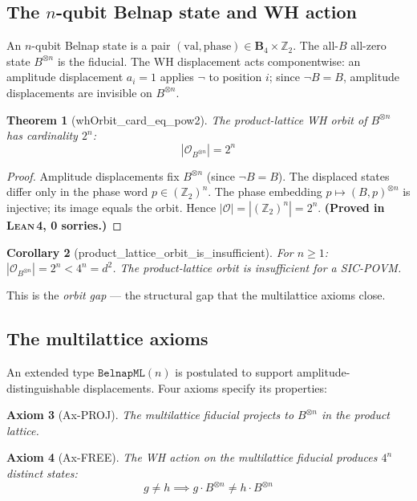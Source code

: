 \documentclass[12pt,a4paper]{article}
\newtheorem{theorem}{Theorem}[section]
\newtheorem{corollary}[theorem]{Corollary}
\newtheorem{axiom_env}[theorem]{Axiom}
\newcommand{\BFour}{\mathbf{B}_4}
\newcommand{\Lean}{\textsc{Lean\,4}}
\begin{document}
\subsection{The $n$-qubit Belnap state and WH action}

An $n$-qubit Belnap state is a pair $(\text{val}, \text{phase}) \in \BFour \times \mathbb{Z}_2$.
The all-$B$ all-zero state $B^{\otimes n}$ is the fiducial.  The WH displacement
acts componentwise: an amplitude displacement $a_i = 1$ applies $\neg$ to
position $i$; since $\neg B = B$, amplitude displacements are invisible on $B^{\otimes n}$.

\begin{theorem}[whOrbit\_card\_eq\_pow2]
\label{thm:orbit-2n}
The product-lattice WH orbit of $B^{\otimes n}$ has cardinality $2^n$:
\[
|\mathcal{O}_{B^{\otimes n}}| = 2^n
\]
\end{theorem}

\begin{proof}
Amplitude displacements fix $B^{\otimes n}$ (since $\neg B = B$).  The displaced
states differ only in the phase word $p \in (\mathbb{Z}_2)^n$.  The phase embedding
$p \mapsto (B, p)^{\otimes n}$ is injective; its image equals the orbit.
Hence $|\mathcal{O}| = |(\mathbb{Z}_2)^n| = 2^n$.  \textbf{(Proved in \Lean{}, 0 sorries.)}
\end{proof}

\begin{corollary}[product\_lattice\_orbit\_is\_insufficient]
\label{cor:gap}
For $n \geq 1$: $|\mathcal{O}_{B^{\otimes n}}| = 2^n < 4^n = d^2$.
The product-lattice orbit is insufficient for a SIC-POVM.
\end{corollary}

This is the \emph{orbit gap} --- the structural gap that the multilattice
axioms close.

\subsection{The multilattice axioms}

An extended type $\texttt{BelnapML}(n)$ is postulated to support amplitude-distinguishable
displacements.  Four axioms specify its properties:

\begin{axiom_env}[Ax-PROJ]
The multilattice fiducial projects to $B^{\otimes n}$ in the product lattice.
\end{axiom_env}

\begin{axiom_env}[Ax-FREE]
The WH action on the multilattice fiducial produces $4^n$ distinct states:
\[
g \neq h \implies g \cdot B^{\otimes n} \neq h \cdot B^{\otimes n}
\]
\end{axiom_env}
\end{document}
